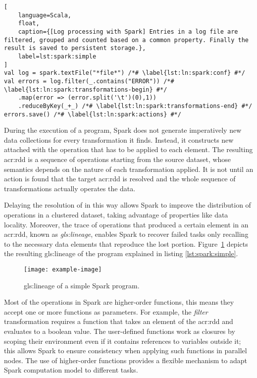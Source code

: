 \begin{lstlisting}[
	language=Scala,
	float,
	caption={[Log processing with Spark] Entries in a log file are filtered, grouped and counted based on a common property. Finally the result is saved to persistent storage.},
	label=lst:spark:simple
]
val log = spark.textFile("*file*") /*# \label{lst:ln:spark:conf} #*/
val errors = log.filter(_.contains("ERROR")) /*# \label{lst:ln:spark:transformations-begin} #*/
	.map(error => (error.split('\t')(0),1))
	.reduceByKey(_+_) /*# \label{lst:ln:spark:transformations-end} #*/
errors.save() /*# \label{lst:ln:spark:actions} #*/
\end{lstlisting}

During the execution of a program, Spark does not generate imperatively new data collections for every transformation it finds. Instead, it constructs new  attached with the operation that has to be applied to each element. The resulting \acrshort{acr:rdd} is a sequence of operations starting from the source dataset, whose semantics depends on the nature of each transformation applied. It is not until an action is found that the target \acrshort{acr:rdd} is resolved and the whole sequence of transformations actually operates the data. 

Delaying the resolution of  in this way allows Spark to improve the distribution of operations in a clustered dataset, taking advantage of properties like data locality. Moreover, the trace of operations that produced a certain element in an \acrshort{acr:rdd}, known as \textit{\gls{gls:lineage}}, enables Spark to recover failed tasks only recalling to the necessary data elements that reproduce the lost portion. Figure~\ref{fig:spark:lineage} depicts the resulting \gls{gls:lineage} of the program explained in listing \ref{lst:spark:simple}.


\begin{figure}[h]
\centering
\texttt{[image: example-image]}
\caption{\Gls{gls:lineage} of a simple Spark program.}
\label{fig:spark:lineage}
\end{figure}

Most of the operations in Spark are higher-order functions, this means they accept one or more functions as parameters. For example, the \textit{filter} transformation requires a function that takes an element of the \acrshort{acr:rdd} and evaluates to a boolean value. The user-defined functions work as closures by scoping their environment even if it contains references to variables outside it; this allows Spark to ensure consistency when applying such functions in parallel nodes. The use of higher-order functions provides a flexible mechanism to adapt Spark computation model to different tasks.

